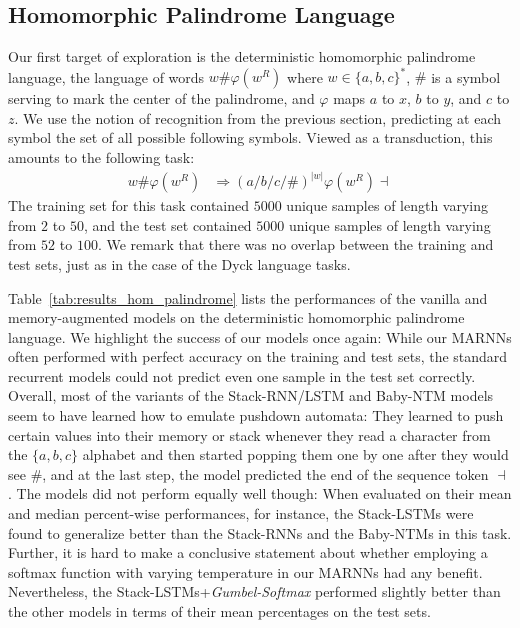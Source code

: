 \documentclass[11pt,a4paper]{article}
\theoremstyle{plain}
\begin{document}
\vspace{-0.4em}
\subsection{Homomorphic Palindrome Language} 
Our first target of exploration is the deterministic homomorphic palindrome language, the language of words $w\#\varphi(w^{R})$ where $w \in \{a, b, c\}^*$, $\#$ is a symbol serving to mark the center of the palindrome, and $\varphi$ maps $a$ to $x$, $b$ to $y$, and $c$ to $z$. We use the notion of recognition from the previous section, predicting at each symbol the set of all possible following symbols. Viewed as a transduction, this amounts to the following task:
\vspace{-0.2em}
\begin{align*}
    w\# \varphi(w^R) &\Rightarrow (a/b/c/\#)^{|w|} \varphi(w^{R})\dashv
\end{align*}
\vspace{-0.2em}
The training set for this task contained $5000$ unique samples of length varying from $2$ to $50$, and the test set contained $5000$ unique samples of length varying from $52$ to $100$. We remark that there was no overlap between the training and test sets, just as in the case of the Dyck language tasks. 

Table~\ref{tab:results_hom_palindrome} lists the performances of the vanilla and memory-augmented models on the deterministic homomorphic palindrome language. We highlight the success of our models once again: While our MARNNs often performed with perfect accuracy on the training and test sets, the standard recurrent models could not predict even one sample in the test set correctly. Overall, most of the variants of the Stack-RNN/LSTM and Baby-NTM models seem to have learned how to emulate pushdown automata: They learned to push certain values into their memory or stack whenever they read a character from the $\{a, b, c\}$ alphabet and then started popping them one by one after they would see $\#$, and at the last step, the model predicted the end of the sequence token $\dashv$. The models did not perform equally well though: When evaluated on their mean and median percent-wise performances, for instance, the Stack-LSTMs were found to generalize better than the Stack-RNNs and the Baby-NTMs in this task. Further, it is hard to make a conclusive statement about whether employing a softmax function with varying temperature in our MARNNs had any benefit. Nevertheless, the Stack-LSTMs+\textit{Gumbel-Softmax} performed slightly better than the other models in terms of their mean percentages on the test sets.
 
\end{document}
